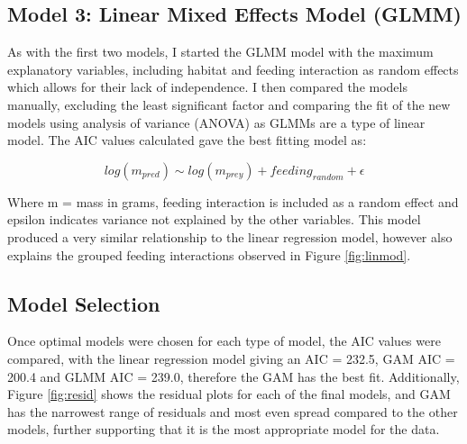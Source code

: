 \documentclass[11pt,a4paper]{article}
\begin{document}
	\subsection{Model 3: Linear Mixed Effects Model (GLMM)}	
	
	\par \noindent As with the first two models, I started the GLMM model with the maximum explanatory variables, including habitat and feeding interaction as random effects which allows for their lack of independence. I then compared the models manually, excluding the least significant factor and comparing the fit of the new models using analysis of variance (ANOVA) as GLMMs are a type of linear model. The AIC values calculated gave the best fitting model as:
	
	\begin{equation*}
		log(m_{pred}) \sim log(m_{prey}) + feeding_{random} + \epsilon
	\end{equation*}
	
	\par \noindent Where m = mass in grams, feeding interaction is included as a random effect and epsilon indicates variance not explained by the other variables. This model produced a very similar relationship to the linear regression model, however also explains the grouped feeding interactions observed in Figure \ref{fig:linmod}.
	
	\subsection{Model Selection}
	
	\par \noindent Once optimal models were chosen for each type of model, the AIC values were compared, with the linear regression model giving an AIC = 232.5, GAM AIC = 200.4 and GLMM AIC = 239.0, therefore the GAM has the best fit. Additionally, Figure \ref{fig:resid} shows the residual plots for each of the final models, and GAM has the narrowest range of residuals and most even spread compared to the other models, further supporting that it is the most appropriate model for the data.
	
\end{document}
